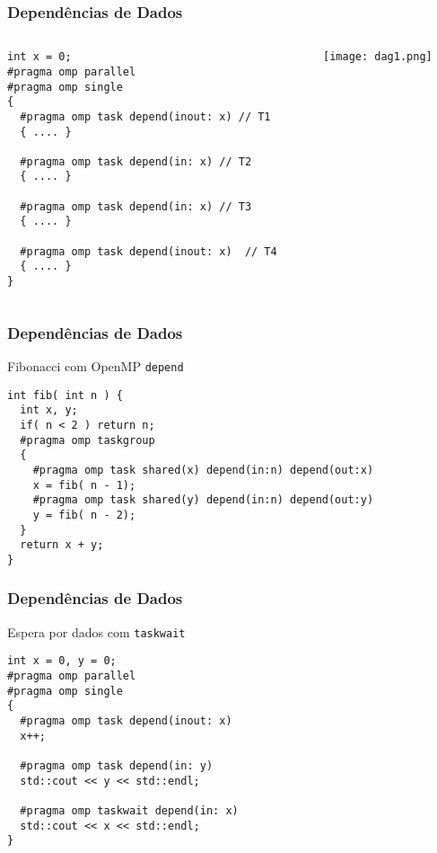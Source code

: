 \begin{frame}[fragile]
  \frametitle{Dependências de Dados}
  \begin{columns}
    \begin{column}{0.8\textwidth}
      \begin{center}
        \begin{minipage}{0.95\textwidth}  
\begin{verbatim}  
int x = 0;
#pragma omp parallel
#pragma omp single
{
  #pragma omp task depend(inout: x) // T1 
  { .... }

  #pragma omp task depend(in: x) // T2 
  { .... }  

  #pragma omp task depend(in: x) // T3 
  { .... }

  #pragma omp task depend(inout: x)  // T4
  { .... }  
}
\end{verbatim}
  \end{minipage}
    \end{center}    
  \end{column}
  \begin{column}{0.2\textwidth}
    \begin{center}
    \texttt{[image: dag1.png]}
    \end{center}       
  \end{column}
\end{columns}
\end{frame}
\begin{frame}[fragile]
  \frametitle{Dependências de Dados}
Fibonacci com OpenMP \texttt{depend}
\begin{minipage}{0.95\textwidth}  
\begin{verbatim}  
int fib( int n ) {
  int x, y;
  if( n < 2 ) return n;
  #pragma omp taskgroup
  {
    #pragma omp task shared(x) depend(in:n) depend(out:x)
    x = fib( n - 1);
    #pragma omp task shared(y) depend(in:n) depend(out:y)
    y = fib( n - 2);
  }
  return x + y;
}
\end{verbatim}
\end{minipage}
\end{frame}
\begin{frame}[fragile]
  \frametitle{Dependências de Dados}
Espera por dados com \texttt{taskwait}
\begin{minipage}{0.95\textwidth}  
\begin{verbatim}  
int x = 0, y = 0;
#pragma omp parallel
#pragma omp single
{
  #pragma omp task depend(inout: x)
  x++;

  #pragma omp task depend(in: y)
  std::cout << y << std::endl;

  #pragma omp taskwait depend(in: x)
  std::cout << x << std::endl;
}
\end{verbatim}
\end{minipage}
\end{frame}
